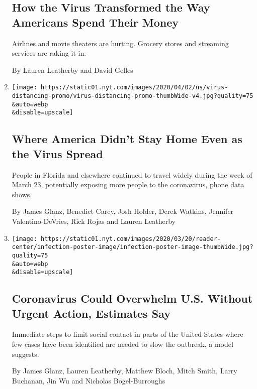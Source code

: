 \begin{enumerate}
  \hypertarget{how-the-virus-transformed-the-way-americans-spend-their-money}{%
  \subsection{How the Virus Transformed the Way Americans Spend Their
  Money}\label{how-the-virus-transformed-the-way-americans-spend-their-money}}

  Airlines and movie theaters are hurting. Grocery stores and streaming
  services are raking it in.

  By Lauren Leatherby and David Gelles
\item
  \href{/interactive/2020/04/02/us/coronavirus-social-distancing.html}{}

  \texttt{[image: https://static01.nyt.com/images/2020/04/02/us/virus-distancing-promo/virus-distancing-promo-thumbWide-v4.jpg?quality=75\\\&auto=webp\\\&disable=upscale]}

  \hypertarget{where-america-didnt-stay-home-even-as-the-virus-spread}{%
  \subsection{Where America Didn't Stay Home Even as the Virus
  Spread}\label{where-america-didnt-stay-home-even-as-the-virus-spread}}

  People in Florida and elsewhere continued to travel widely during the
  week of March 23, potentially exposing more people to the coronavirus,
  phone data shows.

  By James Glanz, Benedict Carey, Josh Holder, Derek Watkins, Jennifer
  Valentino-DeVries, Rick Rojas and Lauren Leatherby
\item
  \href{/interactive/2020/03/20/us/coronavirus-model-us-outbreak.html}{}

  \texttt{[image: https://static01.nyt.com/images/2020/03/20/reader-center/infection-poster-image/infection-poster-image-thumbWide.jpg?quality=75\\\&auto=webp\\\&disable=upscale]}

  \hypertarget{coronavirus-could-overwhelm-us-without-urgent-action-estimates-say}{%
  \subsection{Coronavirus Could Overwhelm U.S. Without Urgent Action,
  Estimates
  Say}\label{coronavirus-could-overwhelm-us-without-urgent-action-estimates-say}}

  Immediate steps to limit social contact in parts of the United States
  where few cases have been identified are needed to slow the outbreak,
  a model suggests.

  By James Glanz, Lauren Leatherby, Matthew Bloch, Mitch Smith, Larry
  Buchanan, Jin Wu and Nicholas Bogel-Burroughs
\end{enumerate}

